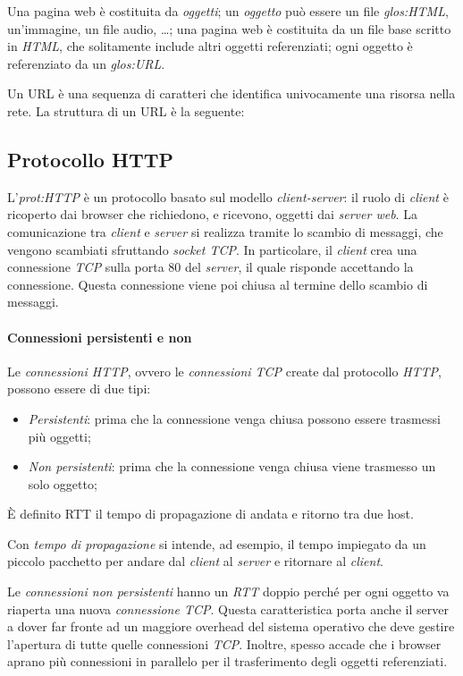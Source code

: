 Una pagina web è costituita da \emph{oggetti}; un \emph{oggetto} può essere un
file \emph{\gls{glos:HTML}}, un'immagine, un file audio, \dots; una pagina web è
costituita da un file base scritto in \emph{HTML}, che solitamente include altri
oggetti referenziati; ogni oggetto è referenziato da un \emph{\gls{glos:URL}}.
\begin{definition}[URL]
    Un URL è una sequenza di caratteri che identifica univocamente una
    risorsa nella rete. La struttura di un URL è la seguente:

    \centering{}
\end{definition}

\subsection{Protocollo HTTP}
L'\emph{\gls{prot:HTTP}} è un protocollo basato sul modello \emph{client-server}:
il ruolo di \emph{client} è ricoperto dai browser che richiedono, e ricevono,
oggetti dai \emph{server web}. La comunicazione tra \emph{client} e \emph{server}
si realizza tramite lo scambio di messaggi, che vengono scambiati sfruttando
\emph{socket TCP}. In particolare, il \emph{client} crea una connessione
\emph{TCP} sulla porta 80 del \emph{server}, il quale risponde accettando la
connessione. Questa connessione viene poi chiusa al termine dello scambio di
messaggi.

\paragraph{Connessioni persistenti e non}
Le \emph{connessioni HTTP}, ovvero le \emph{connessioni TCP} create dal
protocollo \emph{HTTP}, possono essere di due tipi:
\begin{itemize}
    \item \emph{Persistenti}: prima che la connessione venga chiusa possono
    essere trasmessi più oggetti;
    \item \emph{Non persistenti}: prima che la connessione venga chiusa viene
    trasmesso un solo oggetto;
\end{itemize}
\begin{definition}
    È definito RTT il tempo di propagazione di andata e ritorno tra due host.
\end{definition}
\begin{note}
    Con \emph{tempo di propagazione} si intende, ad esempio, il tempo impiegato
    da un piccolo pacchetto per andare dal \emph{client} al \emph{server} e
    ritornare al \emph{client}.
\end{note}
Le \emph{connessioni non persistenti} hanno un \emph{RTT} doppio perché per ogni
oggetto va riaperta una nuova \emph{connessione TCP}. Questa caratteristica
porta anche il server a dover far fronte ad un maggiore overhead del sistema
operativo che deve gestire l'apertura di tutte quelle connessioni \emph{TCP}.
Inoltre, spesso accade che i browser aprano più connessioni in parallelo per il
trasferimento degli oggetti referenziati.

